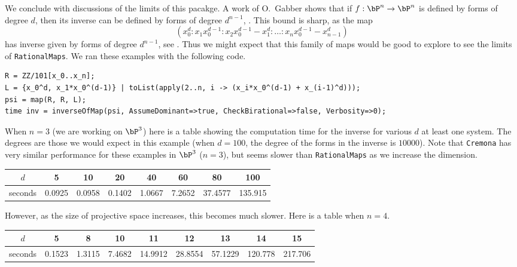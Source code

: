 \documentclass[11pt]{amsart}%
\numberwithin{equation}{theorem}
\renewcommand{\:}{\colon}
\theoremstyle{theorem}
\begin{document}
{{%

We conclude with discussions of the limits of this pacakge.
A work of O.~Gabber shows that if $f : \bP^n \to \bP^n$ is defined by forms of degree $d$, then its inverse can be defined by forms of degree $d^{n-1}$, \cite{BassConnellWrightJacobianConjecture}.  This bound is sharp, as the map
    \[
        (x_0^d : x_1 x_0^{d-1} : x_2 x_0^{d-1} - x_1^d : \dots : x_n x_0^{d-1} - x_{n-1}^d)
    \]
    has inverse given by forms of degree $d^{n-1}$, see \cite{HassanzadehSimisBoundsOnDegreesOfBirat}.  Thus we might expect that this family of maps would be good to explore to see the limits of {\tt RationalMaps}.  We ran these examples with the following code.
}
{\scriptsize
\color{blue}
\begin{verbatim}
R = ZZ/101[x_0..x_n];
L = {x_0^d, x_1*x_0^(d-1)} | toList(apply(2..n, i -> (x_i*x_0^(d-1) + x_(i-1)^d)));
psi = map(R, R, L);
time inv = inverseOfMap(psi, AssumeDominant=>true, CheckBirational=>false, Verbosity=>0);
\end{verbatim}%
}%
{\color{black}\normalsize
When $n = 3$ (we are working on $\bP^3$) here is a table showing the computation time for the inverse for various $d$ at least one  system.  The degrees are those we would expect in this example (when $d = 100$, the degree of the forms in the inverse is $10000$).  Note that  {\tt Cremona} has very similar performance for these examples in $\bP^3$ ($n = 3$), but seems slower than {\tt RationalMaps} as we increase the dimension.
\begin{center}
\begin{tabular}{c|c|c|c|c|c|c|c}
  $d$ & 5 & 10 & 20 & 40 & 60 & 80 & 100 \\ \hline
  seconds  &  0.0925 &  0.0958 & 0.1402 &  1.0667 & 7.2652 &  37.4577 & 135.915 \\
\end{tabular}
\end{center}
However, as the size of projective space increases, this becomes much slower.  Here is a table when $n = 4$.
\begin{center}
  \begin{tabular}{c|c|c|c|c|c|c|c|c}
    $d$ & 5 & 8 & 10 & 11 & 12 & 13 & 14 & 15 \\ \hline
    seconds  &  0.1523 & 1.3115 &  7.4682 &  14.9912 &   28.8554 & 57.1229 &   120.778 &  217.706 \\
  \end{tabular}
\end{center}

}}
\end{document}
